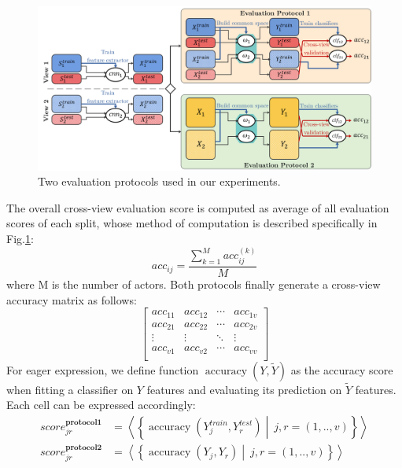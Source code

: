     \begin{figure}[htbp]
      \centering
      \includegraphics[width=1\linewidth]{figs/protocol.png}
      \caption{Two evaluation protocols used in our experiments.}
      \label{Fig:ep}
    \end{figure}
    The overall cross-view evaluation score is computed as average of all evaluation scores of each split, whose method of computation is described specifically in Fig.\ref{Fig:ep}:
    \begin{equation}
        {acc}_{ij} = \frac{\sum_{k=1}^M {acc}^{(k)}_{ij}}{M}
    \end{equation}
    where M is the number of actors. Both protocols finally generate a cross-view accuracy matrix as follows:
    \begin{equation}
        \left[\begin{matrix}{acc}_{11}&{acc}_{12}&\cdots&{acc}_{1v}\\{acc}_{21}&{acc}_{22}&\cdots&{acc}_{2v}\\\vdots&\vdots&\ddots&\vdots\\{acc}_{v1}&{acc}_{v2}&\cdots&{acc}_{vv}\\\end{matrix}\right]
        \label{eq:multiview_scores}
    \end{equation}
    For eager expression, we define function $\operatorname{accuracy}\left(Y, \tilde{Y}\right)$ as the accuracy score when fitting a classifier on $Y$ features and evaluating its prediction on $\tilde{Y}$ features. Each cell can be expressed accordingly:
    \begin{align}
        {score}_{jr}^{\boldsymbol{protocol 1}} & =\left<\left\{\operatorname{accuracy}\left(Y_j^{train},Y_r^{test}\right)\middle|\ j,r=(1,..,v)\right\}\right> \\
        {score}_{jr}^{\boldsymbol{protocol 2}} & =\left<\left\{\operatorname{accuracy}\left(Y_j,Y_r\right)\middle|\ j,r=(1,..,v)\right\}\right>
    \end{align}

